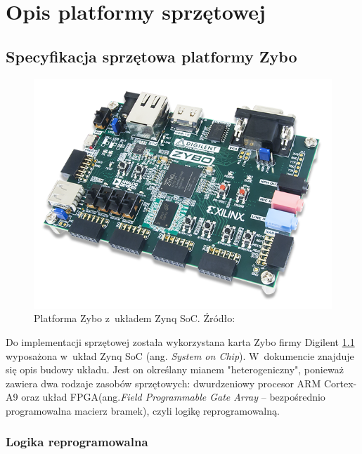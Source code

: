 \chapter{Opis platformy sprzętowej}

\section{Specyfikacja sprzętowa platformy Zybo}

\begin{figure}[h]
	\centering
	\includegraphics[scale=2]{zybo_img.png}
	\caption{Platforma Zybo z~układem Zynq SoC. Źródło: \cite{zybo_img}}
	\label{fig:zybo_img}
\end{figure}

Do implementacji sprzętowej została wykorzystana karta Zybo firmy Digilent \ref{fig:zybo_img} wyposażona w~układ Zynq SoC (ang. \textit{System on Chip}). 
W~dokumencie \cite{zybo_description} znajduje się opis budowy układu. 
Jest on określany mianem "heterogeniczny", ponieważ zawiera dwa rodzaje zasobów sprzętowych: dwurdzeniowy procesor ARM Cortex-A9 oraz układ FPGA(ang.\textit{Field Programmable Gate Array} -- bezpośrednio programowalna macierz bramek), czyli logikę reprogramowalną.

\subsection{Logika reprogramowalna}



